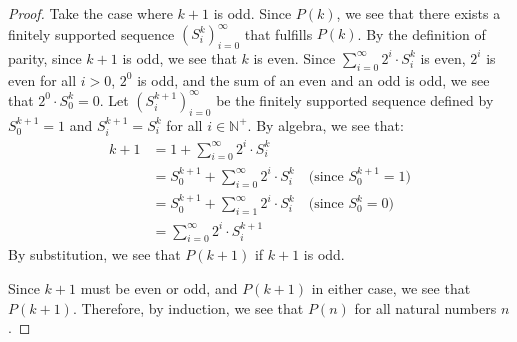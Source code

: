 \documentclass{amsart}
\newcommand{\N}{\mathbb{N}}
\numberwithin{equation}{section}
\begin{document}
\begin{problem}[manual-num=74]
\begin{proof}
			Take the case where $k + 1$ is odd.
			Since $P(k)$, we see that there exists a finitely supported sequence $(S^k_i)_{i = 0}^\infty$ that fulfills $P(k)$.
			By the definition of parity, since $k + 1$ is odd, we see that $k$ is even.
			Since $\sum_{i = 0}^\infty 2^i \cdot S^k_i$ is even, $2^i$ is even for all $i > 0$, $2^0$ is odd, and the sum of an even and an odd is odd, we see that $2^0 \cdot S^k_0 = 0$.
			Let $(S^{k + 1}_i)_{i = 0}^\infty$ be the finitely supported sequence defined by $S^{k + 1}_0 = 1$ and $S^{k + 1}_i = S^k_i$ for all $i \in \N^+$.
			By algebra, we see that:
			\begin{align*}
				k + 1 &= 1 + \sum_{i = 0}^\infty 2^i \cdot S^k_i \\
				&= S^{k + 1}_0 + \sum_{i = 0}^\infty 2^i \cdot S^k_i \quad \text{(since $S^{k + 1}_0 = 1$)} \\
				&= S^{k + 1}_0 + \sum_{i = 1}^\infty 2^i \cdot S^k_i \quad \text{(since $S^k_0 = 0$)} \\
				&= \sum_{i = 0}^\infty 2^i \cdot S^{k + 1}_i
			\end{align*}
			By substitution, we see that $P(k + 1)$ if $k + 1$ is odd.

			Since $k + 1$ must be even or odd, and $P(k + 1)$ in either case, we see that $P(k + 1)$.
			Therefore, by induction, we see that $P(n)$ for all natural numbers $n$.
		\end{proof}
	\end{problem}
\end{document}
